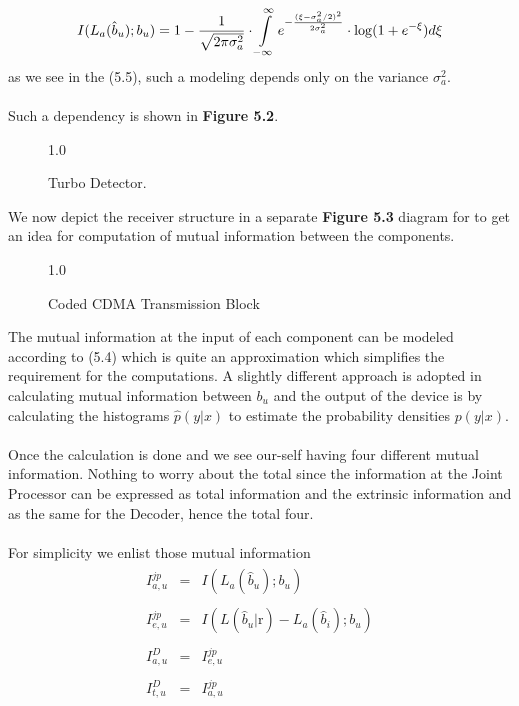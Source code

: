 \begin{equation}
I(L_a(\hat{b}_u);b_u)=1-\frac{\hbox{$1$}}{\hbox{$\sqrt{2\pi\sigma_a^2}$}}\cdot\int\limits_{-\infty}^{\infty}e^{-\frac{(\xi-\sigma_a^2/2)^2}{2\sigma_a^2}}\cdot \mathrm{log}(1+e^{-\xi})d\xi
\end{equation}
as we see in the (5.5), such a modeling depends only on the variance $\sigma_a^2$.\\ \\
Such a dependency is shown in \textbf{Figure 5.2}.
\begin{figure}[htb]
\centerline{  {1.0} }
\caption{Turbo Detector.}
\end{figure}
We now depict the receiver structure in a separate \textbf{Figure 5.3} diagram for to get an idea for computation of mutual information between the components. 
\begin{figure}[htb]
\centerline{  {1.0} }
\caption{Coded CDMA Transmission Block}
\end{figure}
The mutual information at the input of each component can be modeled according to (5.4) which is quite an approximation which simplifies the requirement for the computations. A slightly different approach is adopted in calculating mutual information between $b_u$ and the output of the device is by calculating the histograms $\hat{p}(y\vert x)$ to estimate the probability densities $p(y\vert x)$.\\ \\
Once the calculation is done and we see our-self having four different mutual information. Nothing to worry about the total since the information at the Joint Processor can be expressed as total information and the extrinsic information and as the same for the Decoder, hence the total four. \\ \\
For simplicity we enlist those mutual information 
\begin{eqnarray*}
\begin{array}{lll}
I_{a,u}^{jp}&=&I(L_a(\hat{b}_u);b_u) \\ \\
I_{e,u}^{jp}&=&I(L(\hat{b}_u\vert \mathbf{\mathrm{r}})-L_a(\hat{b}_i);b_u) \\ \\
I_{a,u}^D&=&I_{e,u}^{jp} \\ \\
I_{t,u}^D&=&I_{a,u}^{jp} \\ \\
\end{array}
\end{eqnarray*}
